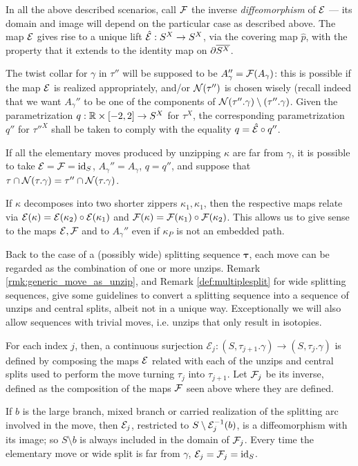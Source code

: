 \begin{rmk}
In all the above described scenarios, call $\mathcal{F}$ the inverse \emph{diffeomorphism} of $\mathcal{E}$ --- its domain and image will depend on the particular case as described above. The map $\mathcal{E}$ gives rise to a unique lift $\hat{\mathcal{E}}:S^X\rightarrow S^X$, via the covering map $\hat p$, with the property that it extends to the identity map on $\partial\overline{S^X}$.

The twist collar for $\gamma$ in $\tau''$ will be supposed to be $A_\gamma''= \mathcal{F}(A_\gamma)$: this is possible if the map $\mathcal{E}$ is realized appropriately, and/or ${\mathcal N}(\tau'')$ is chosen wisely (recall indeed that we want $A_\gamma''$ to be one of the components of ${\mathcal N}(\tau''.\gamma)\setminus(\tau''.\gamma)$. Given the parametrization $q:\mathbb R\times [-2,2]\rightarrow S^X$ for $\tau^X$, the corresponding parametrization $q''$ for ${\tau''}^X$ shall be taken to comply with the equality $q=\hat{\mathcal{E}}\circ q''$.

If all the elementary moves produced by unzipping $\kappa$ are far from $\gamma$, it is possible to take $\mathcal{E}=\mathcal{F}=\mathrm{id}_S$, $A_\gamma''=A_\gamma$, $q=q''$, and suppose that $\tau\cap{\mathcal N}(\tau.\gamma)=\tau''\cap{\mathcal N}(\tau.\gamma)$.

If $\kappa$ decomposes into two shorter zippers $\kappa_1,\kappa_1$, then the respective maps relate via $\mathcal{E}(\kappa)=\mathcal{E}(\kappa_2)\circ \mathcal{E}(\kappa_1)$ and $\mathcal{F}(\kappa)=\mathcal{F}(\kappa_1)\circ \mathcal{F}(\kappa_2)$. This allows us to give sense to the maps $\mathcal{E},\mathcal{F}$ and to $A_\gamma''$ even if $\kappa_P$ is not an embedded path.

Back to the case of a (possibly wide) splitting sequence $\bm\tau$, each move can be regarded as the combination of one or more unzips. Remark \ref{rmk:generic_move_as_unzip}, and Remark \ref{def:multiplesplit} for wide splitting sequences, give some guidelines to convert a splitting sequence into a sequence of unzips and central splits, albeit not in a unique way. Exceptionally we will also allow sequences with trivial moves, i.e. unzips that only result in isotopies.

For each index $j$, then, a continuous surjection ${\mathcal E}_j:(S,\tau_{j+1}.\gamma)\rightarrow(S,\tau_j.\gamma)$ is defined by composing the maps $\mathcal{E}$ related with each of the unzips and central splits used to perform the move turning $\tau_j$ into $\tau_{j+1}$. Let $\mathcal{F}_j$ be its inverse, defined as the composition of the maps $\mathcal{F}$ seen above where they are defined.

If $b$ is the large branch, mixed branch or carried realization of the splitting arc involved in the move, then $\mathcal{E}_j$, restricted to $S\setminus \mathcal{E}_j^{-1}(b)$, is a diffeomorphism with its image; so $S\setminus b$ is always included in the domain of $\mathcal{F}_j$. Every time the elementary move or wide split is far from $\gamma$, $\mathcal{E}_j=\mathcal{F}_j=\mathrm{id}_S$. 


\end{rmk}
